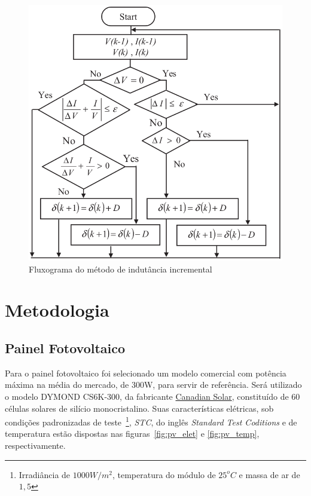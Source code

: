 \documentclass[
	12pt,				%
	openright,			%
	onseside,
	a4paper,			%
	english,			%
	french,				%
	spanish,			%
	brazil,				%
	]{abntex2}
\begin{document}
\begin{figure}[htbp]
	\begin{center}
		\includegraphics[width=0.55 \linewidth]{incCond_flow}
		\caption{Fluxograma do método de indutância incremental \cite{Talha_MPPT}}
		\label{fig:IncCond_Flux}
	\end{center}
\end{figure}




\chapter{Metodologia}

\section{Painel Fotovoltaico}

Para o painel fotovoltaico foi selecionado um modelo comercial com potência máxima na média do mercado, de 300W, para servir de referência. Será utilizado o modelo DYMOND CS6K-300, da fabricante \href{https://www.canadiansolar.com/en}{Canadian Solar}, constituído de 60 células solares de silício monocristalino. Suas características elétricas, sob condições padronizadas de teste~\footnote{Irradiância de $1000W/m^2$, temperatura do módulo de $25^oC$ e massa de ar de $1,5$}, \emph{STC}, do inglês \textit{Standard Test Coditions} e de temperatura estão dispostas nas figuras~\ref{fig:pv_elet} e \ref{fig:pv_temp}, respectivamente.
\end{document}
